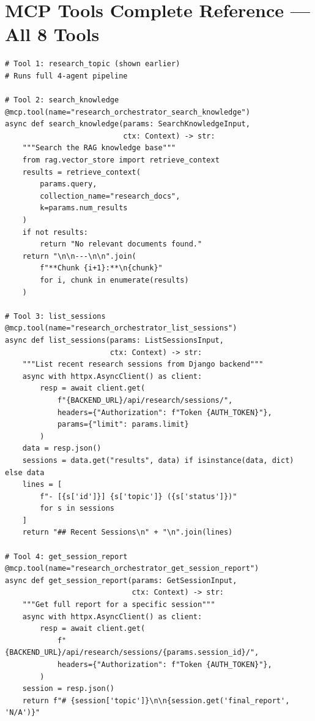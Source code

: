 \documentclass[11pt,a4paper,twoside]{report}
\begin{document}

\chapter{MCP Tools Complete Reference --- All 8 Tools}

\begin{lstlisting}[style=pythonstyle,caption={mcp\_server.py --- All 8 MCP Tools}]
# Tool 1: research_topic (shown earlier)
# Runs full 4-agent pipeline

# Tool 2: search_knowledge
@mcp.tool(name="research_orchestrator_search_knowledge")
async def search_knowledge(params: SearchKnowledgeInput,
                           ctx: Context) -> str:
    """Search the RAG knowledge base"""
    from rag.vector_store import retrieve_context
    results = retrieve_context(
        params.query,
        collection_name="research_docs",
        k=params.num_results
    )
    if not results:
        return "No relevant documents found."
    return "\n\n---\n\n".join(
        f"**Chunk {i+1}:**\n{chunk}"
        for i, chunk in enumerate(results)
    )

# Tool 3: list_sessions
@mcp.tool(name="research_orchestrator_list_sessions")
async def list_sessions(params: ListSessionsInput,
                        ctx: Context) -> str:
    """List recent research sessions from Django backend"""
    async with httpx.AsyncClient() as client:
        resp = await client.get(
            f"{BACKEND_URL}/api/research/sessions/",
            headers={"Authorization": f"Token {AUTH_TOKEN}"},
            params={"limit": params.limit}
        )
    data = resp.json()
    sessions = data.get("results", data) if isinstance(data, dict) else data
    lines = [
        f"- [{s['id']}] {s['topic']} ({s['status']})"
        for s in sessions
    ]
    return "## Recent Sessions\n" + "\n".join(lines)

# Tool 4: get_session_report
@mcp.tool(name="research_orchestrator_get_session_report")
async def get_session_report(params: GetSessionInput,
                             ctx: Context) -> str:
    """Get full report for a specific session"""
    async with httpx.AsyncClient() as client:
        resp = await client.get(
            f"{BACKEND_URL}/api/research/sessions/{params.session_id}/",
            headers={"Authorization": f"Token {AUTH_TOKEN}"},
        )
    session = resp.json()
    return f"# {session['topic']}\n\n{session.get('final_report', 'N/A')}"


\end{lstlisting}
\end{document}
